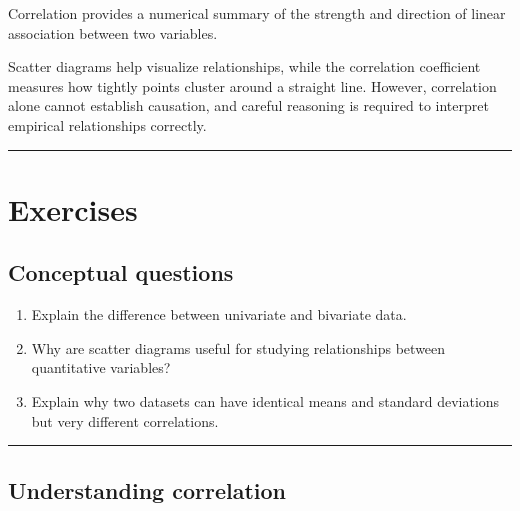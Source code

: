 \documentclass[
  letterpaper,
  DIV=11,
  numbers=noendperiod]{scrreprt}
\begin{document}
\begin{tcolorbox}[enhanced jigsaw, coltitle=black, colbacktitle=quarto-callout-important-color!10!white, left=2mm, bottomrule=.15mm, bottomtitle=1mm, colback=white, titlerule=0mm, colframe=quarto-callout-important-color-frame, breakable, leftrule=.75mm, toptitle=1mm, opacitybacktitle=0.6, rightrule=.15mm, title=\textcolor{quarto-callout-important-color}{\faExclamation}\hspace{0.5em}{Chapter summary}, arc=.35mm, opacityback=0, toprule=.15mm]

Correlation provides a numerical summary of the strength and direction
of linear association between two variables.

Scatter diagrams help visualize relationships, while the correlation
coefficient measures how tightly points cluster around a straight line.
However, correlation alone cannot establish causation, and careful
reasoning is required to interpret empirical relationships correctly.

\end{tcolorbox}

\begin{center}\rule{0.5\linewidth}{0.5pt}\end{center}

\section{Exercises}\label{exercises-2}

\subsection{Conceptual questions}\label{conceptual-questions-2}

\begin{enumerate}
\def\labelenumi{\arabic{enumi}.}
\item
  Explain the difference between univariate and bivariate data.
\item
  Why are scatter diagrams useful for studying relationships between
  quantitative variables?
\item
  Explain why two datasets can have identical means and standard
  deviations but very different correlations.
\end{enumerate}

\begin{center}\rule{0.5\linewidth}{0.5pt}\end{center}

\subsection{Understanding correlation}\label{understanding-correlation}
\end{document}
